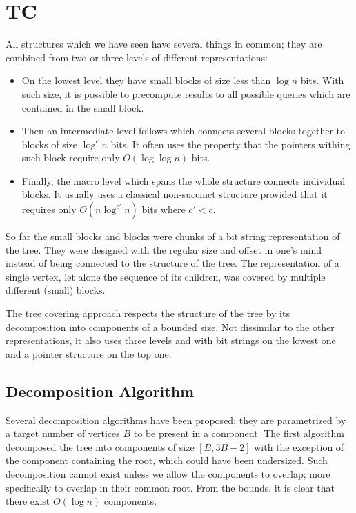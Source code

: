 \section{TC}

All structures which we have seen have several things in common; they are combined from two or three levels of different representations:
\begin{itemize}
	\item On the lowest level they have small blocks of size less than $\log n$ bits.
	With such size, it is possible to precompute results to all possible queries which are contained in the small block.
	\item Then an intermediate level follows which connects several blocks together to blocks of size $\log^c n$ bits.
	It often uses the property that the pointers withing such block require only $O(\log \log n)$ bits.
	\item Finally, the macro level which spans the whole structure connects individual blocks.
	It usually uses a classical non-succinct structure provided that it requires only $O(n \log^{c'} n)$ bits where $c' < c$.
\end{itemize}

So far the small blocks and blocks were chunks of a bit string representation of the tree.
They were designed with the regular size and offset in one's mind instead of being connected to the structure of the tree.
The representation of a single vertex, let alone the sequence of its children, was covered by multiple different (small) blocks.

The tree covering approach respects the structure of the tree by its decomposition into components of a bounded size.
Not dissimilar to the other representations, it also uses three levels and with bit strings on the lowest one and a pointer structure on the top one.

\subsection{Decomposition Algorithm}

Several decomposition algorithms have been proposed; they are parametrized by a target number of vertices $B$ to be present in a component.
The first algorithm  decomposed the tree into components of size $[B, 3 B - 2]$ with the exception of the component containing the root, which could have been undersized.
Such decomposition cannot exist unless we allow the components to overlap; more specifically to overlap in their common root.
From the bounds, it is clear that there exist $O(\log n)$ components.

